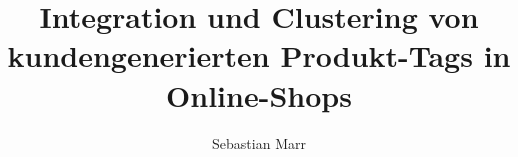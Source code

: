 \documentclass[a4paper, abstracton, DIV=calc]{scrreprt}
\author{Sebastian Marr}
\title{Integration und Clustering von kundengenerierten Produkt-Tags in Online-Shops}
\begin{document}
\maketitle



\tableofcontents




\nocite{*}
\printbibliography 
\end{document}
